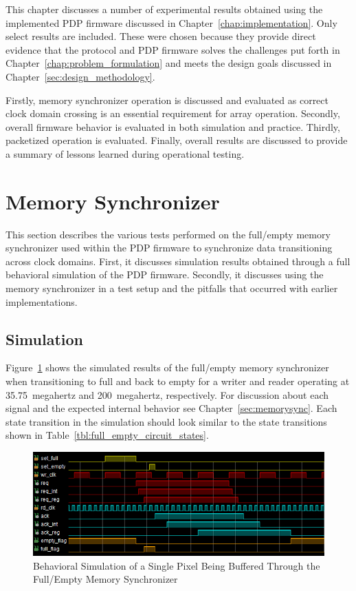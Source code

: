 
\label{chap:experimental_results}

This chapter discusses a number of experimental results obtained using the implemented PDP firmware discussed in Chapter~\ref{chap:implementation}. Only select results are included. These were chosen because they provide direct evidence that the protocol and PDP firmware solves the challenges put forth in Chapter~\ref{chap:problem_formulation} and meets the design goals discussed in Chapter~\ref{sec:design_methodology}.

 Firstly, memory synchronizer operation is discussed and evaluated as correct clock domain crossing is an essential requirement for array operation. Secondly, overall firmware behavior is evaluated in both simulation and practice. Thirdly, packetized operation is evaluated. Finally, overall results are discussed to provide a summary of lessons learned during operational testing.

\section{Memory Synchronizer}

    This section describes the various tests performed on the full/empty memory synchronizer used within the PDP firmware to synchronize data transitioning across clock domains. First, it discusses simulation results obtained through a full behavioral simulation of the PDP firmware. Secondly, it discusses using the memory synchronizer in a test setup and the pitfalls that occurred with earlier implementations.

    \subsection{Simulation}
        Figure~\ref{fig:full_empty_sim} shows the simulated results of the full/empty memory synchronizer when transitioning to full and back to empty for a writer and reader operating at \mbox{35.75 megahertz} and \mbox{200 megahertz}, respectively. For discussion about each signal and the expected internal behavior see Chapter~\ref{sec:memorysync}. Each state transition in the simulation should look similar to the state transitions shown in Table~\ref{tbl:full_empty_circuit_states}.

        \begin{figure}[t]
            \centering
            \includegraphics[width=1.0\textwidth]{fig/full_empty_sim.png}
             \caption{Behavioral Simulation of a Single Pixel Being Buffered Through the Full/Empty Memory Synchronizer}
            \label{fig:full_empty_sim}
        \end{figure}

